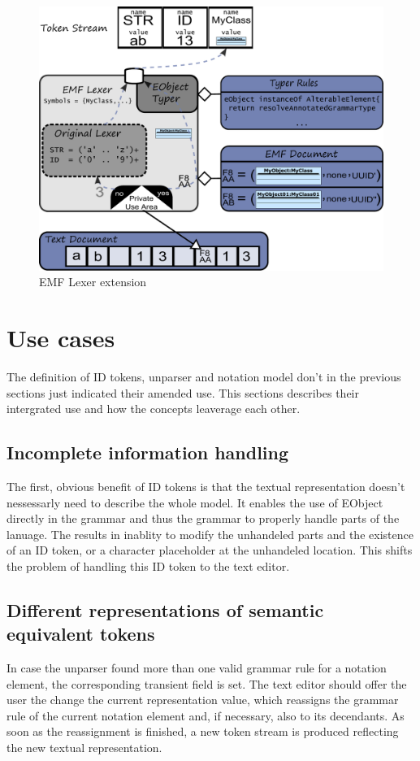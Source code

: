 \begin{figure}
\centering
\includegraphics[scale=0.55]{gfx/ex/Lexer} 
\caption{EMF Lexer extension}
\end{figure}


\section{Use cases}
The definition of ID tokens, unparser and notation model don't in the previous sections just indicated their amended use. This sections describes their intergrated use and how the concepts leaverage each other. 

\subsection{Incomplete information handling}
The first, obvious benefit of ID tokens is that the textual representation doesn't nessessarly need to describe the whole model. It enables the use of EObject directly in the grammar and thus the grammar to properly handle parts of the lanuage. The results in inablity to modify the unhandeled parts and the existence of an ID token, or a character placeholder at the unhandeled location. This shifts the problem of handling this ID token to the text editor.

\subsection{Different representations of semantic equivalent tokens}
In case the unparser found more than one valid grammar rule for a notation element, the corresponding transient field is set. The text editor should offer the user the change the current representation value, which reassigns the grammar rule of the current notation element and, if necessary, also to its decendants. As soon as the reassignment is finished, a new token stream is produced reflecting the new textual representation.


